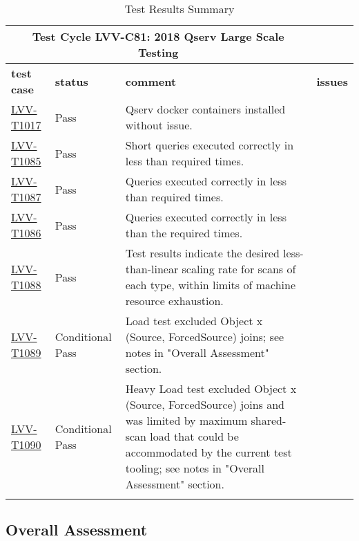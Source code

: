 \documentclass[DM,lsstdraft,STR,toc]{lsstdoc}
\begin{document}
\begin{longtable}{p{}p{}p{}p{}}
\toprule

  \multicolumn{3}{c}{ Test Cycle {\bf LVV-C81: 2018 Qserv Large Scale Testing
 }} \\\hline

  {\bf \footnotesize test case} & {\bf \footnotesize status} & {\bf \footnotesize comment} & {\bf \footnotesize issues} \\\toprule

    \href{https://jira.lsstcorp.org/secure/Tests.jspa#/testCase/LVV-T1017}{LVV-T1017}
    & Pass & Qserv docker containers installed without issue.
 &
    \\\hline
    \href{https://jira.lsstcorp.org/secure/Tests.jspa#/testCase/LVV-T1085}{LVV-T1085}
    & Pass & Short queries executed correctly in less than required times.
 &
    \\\hline
    \href{https://jira.lsstcorp.org/secure/Tests.jspa#/testCase/LVV-T1087}{LVV-T1087}
    & Pass & Queries executed correctly in less than required times.
 &
    \\\hline
    \href{https://jira.lsstcorp.org/secure/Tests.jspa#/testCase/LVV-T1086}{LVV-T1086}
    & Pass & Queries executed correctly in less than the required times.
 &
    \\\hline
    \href{https://jira.lsstcorp.org/secure/Tests.jspa#/testCase/LVV-T1088}{LVV-T1088}
    & Pass & Test results indicate the desired less-than-linear scaling rate for
scans of each type, within limits of machine resource exhaustion.
 &
    \\\hline
    \href{https://jira.lsstcorp.org/secure/Tests.jspa#/testCase/LVV-T1089}{LVV-T1089}
    & Conditional Pass & Load test excluded Object x (Source, ForcedSource) joins; see notes in
"Overall Assessment" section.
 &
    \\\hline
    \href{https://jira.lsstcorp.org/secure/Tests.jspa#/testCase/LVV-T1090}{LVV-T1090}
    & Conditional Pass & Heavy Load test excluded Object x (Source, ForcedSource) joins and was
limited by maximum shared-scan load that could be accommodated by the
current test tooling; see notes in "Overall Assessment" section.
 &
    \\\hline

\caption{Test Results Summary}
\label{table:summary}
\end{longtable}

\subsection{Overall Assessment}
\label{sect:overallassessment}
\end{document}
